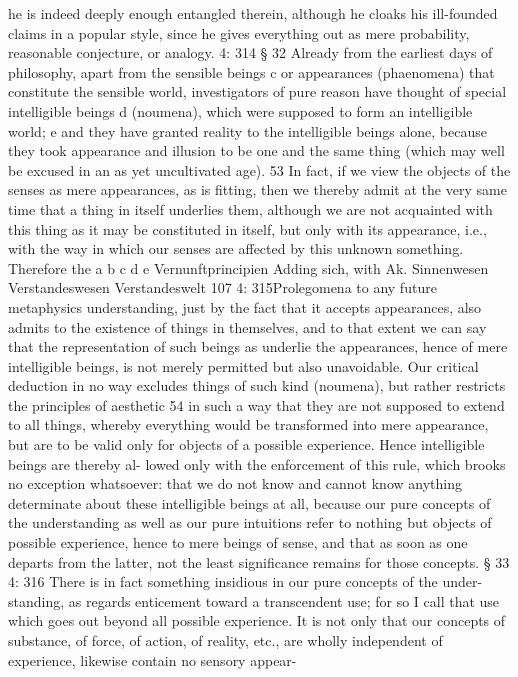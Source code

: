 he is indeed deeply enough entangled therein, although he cloaks his
ill-founded claims in a popular style, since he gives everything out as
mere probability, reasonable conjecture, or analogy.
4: 314
§ 32
Already from the earliest days of philosophy, apart from the sensible
beings c or appearances (phaenomena) that constitute the sensible world,
investigators of pure reason have thought of special intelligible beings d
(noumena), which were supposed to form an intelligible world; e and they
have granted reality to the intelligible beings alone, because they took
appearance and illusion to be one and the same thing (which may well
be excused in an as yet uncultivated age). 53
In fact, if we view the objects of the senses as mere appearances, as is
ﬁtting, then we thereby admit at the very same time that a thing in itself
underlies them, although we are not acquainted with this thing as it may
be constituted in itself, but only with its appearance, i.e., with the way in
which our senses are affected by this unknown something. Therefore the
a
b
c
d
e
Vernunftprincipien
Adding sich, with Ak.
Sinnenwesen
Verstandeswesen
Verstandeswelt
107
4: 315Prolegomena to any future metaphysics
understanding, just by the fact that it accepts appearances, also admits to
the existence of things in themselves, and to that extent we can say that
the representation of such beings as underlie the appearances, hence of
mere intelligible beings, is not merely permitted but also unavoidable.
Our critical deduction in no way excludes things of such kind
(noumena), but rather restricts the principles of aesthetic 54 in such a way
that they are not supposed to extend to all things, whereby everything
would be transformed into mere appearance, but are to be valid only for
objects of a possible experience. Hence intelligible beings are thereby al-
lowed only with the enforcement of this rule, which brooks no exception
whatsoever: that we do not know and cannot know anything determinate
about these intelligible beings at all, because our pure concepts of the
understanding as well as our pure intuitions refer to nothing but objects
of possible experience, hence to mere beings of sense, and that as soon as
one departs from the latter, not the least signiﬁcance remains for those
concepts.
§ 33
4: 316
There is in fact something insidious in our pure concepts of the under-
standing, as regards enticement toward a transcendent use; for so I call
that use which goes out beyond all possible experience. It is not only
that our concepts of substance, of force, of action, of reality, etc., are
wholly independent of experience, likewise contain no sensory appear-
